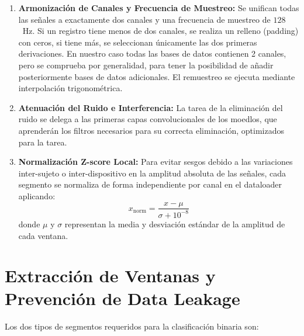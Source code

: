 \begin{enumerate}
  \item \textbf{Armonización de Canales y Frecuencia de Muestreo:}
  Se unifican todas las señales a exactamente dos canales y una frecuencia de
  muestreo de $128$~Hz. Si un registro tiene menos de dos canales, se realiza un relleno
  (padding) con ceros, si tiene más, se seleccionan únicamente las dos primeras
  derivaciones. En nuestro caso todas las bases de datos contienen 2 canales, pero se comprueba
  por generalidad, para tener la posibilidad de añadir posteriormente bases de datos adicionales.
  El remuestreo se ejecuta mediante interpolación trigonométrica.
  \item \textbf{Atenuación del Ruido e Interferencia:}
  La tarea de la eliminación del ruido se delega a las primeras capas convolucionales de los moedlos,
  que aprenderán los filtros necesarios para su correcta eliminación, optimizados para la tarea.
  \item \textbf{Normalización Z-score Local:}
  Para evitar sesgos debido a las variaciones inter-sujeto o inter-dispositivo en la
  amplitud absoluta de las señales, cada segmento se normaliza de forma independiente
  por canal en el dataloader aplicando:
  \begin{equation}
  x_{\text{norm}} = \frac{x - \mu}{\sigma + 10^{-8}}
  \end{equation}
  donde $\mu$ y $\sigma$ representan la media y desviación estándar de la amplitud
  de cada ventana.
\end{enumerate}


\section{Extracción de Ventanas y Prevención de Data Leakage}
\label{sec:extraccion_ventanas}

Los dos tipos de
segmentos requeridos para la clasificación binaria son:

